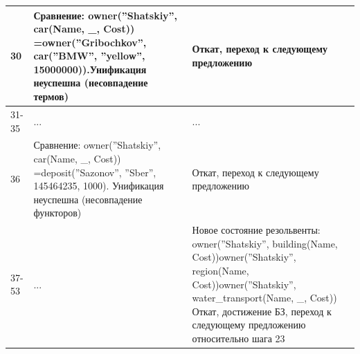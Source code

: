 \documentclass[12pt]{report}
\begin{document}
\begin{table}[H]
\begin{center}
\begin{tabular}{|p{1 cm}|p{10 cm}|p{8 cm}|}
			\hline
			30 & Сравнение: \newline owner(''Shatskiy'', car(Name, \_, Cost)) =\newline owner(''Gribochkov'', car(''BMW'', ''yellow'', 15000000)).\newline Унификация неуспешна (несовпадение термов) & Откат, переход к следующему предложению \\
			\hline
			31-35 & ... & ... \\
			\hline
			36 & Сравнение: \newline owner(''Shatskiy'', car(Name, \_, Cost)) =\newline deposit(''Sazonov'', ''Sber'', 145464235, 1000). \newline Унификация неуспешна (несовпадение функторов) & Откат, переход к следующему предложению \\
			\hline
			37-53 & ... & Новое состояние резольвенты: \newline owner(''Shatskiy'', building(Name, Cost))\newline owner(''Shatskiy'', region(Name, Cost))\newline owner(''Shatskiy'', water\_transport(Name, \_, Cost)) \newline Откат, достижение БЗ, переход к следующему предложению относительно шага 23 \\
			\hline

		\end{tabular}
	\end{center}
\end{table} 
\end{document}
